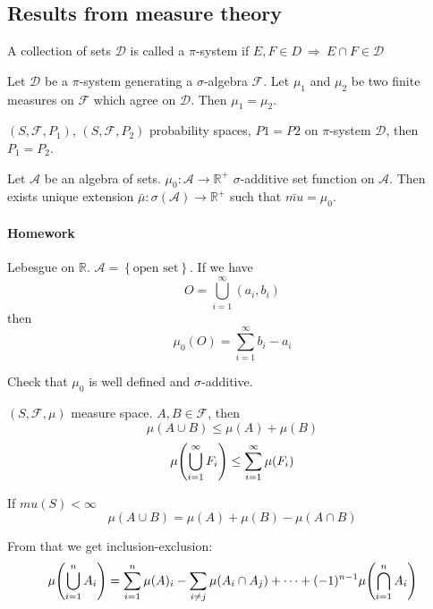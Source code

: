 \subsection{Results from measure theory}
\begin{definition}
	A collection of sets $\mathcal{D}$ is called a $\pi$-system if $E,F \in D \: \Rightarrow \: E\cap F \in \mathcal{D}$
\end{definition}
\begin{theorem}[Uniqness]
	Let $\mathcal{D}$ be a $\pi$-system generating a $\sigma$-algebra $\mathcal{F}$. Let $\mu_1$ and $\mu_2$ be two finite measures on $\mathcal{F}$ which agree on $\mathcal{D}$. Then $\mu_1=\mu_2$.
	
	\begin{coll}
		$(S,\mathcal{F}, P_1)$, $(S,\mathcal{F}, P_2)$ probability spaces, $P1=P2$ on $\pi$-system $\mathcal{D}$, then $P_1=P_2$.
	\end{coll}
\end{theorem}

\begin{theorem}
	Let $\mathcal{A}$ be an algebra of sets. $\mu_0: \mathcal{A} \to \mathbb{R}^+$ $\sigma$-additive set function on $\mathcal{A}$. Then exists unique extension $\bar{\mu} : \sigma(\mathcal{A}) \to \mathbb{R}^+ $ such that $\bar{mu} = \mu_0$.
\end{theorem}

\paragraph{Homework}
Lebesgue on $\mathbb{R}$.  $\mathcal{A} = \left\{ \text{open set} \right\}$. If we have
$$O = \bigcup_{i=1}^\infty (a_i, b_i)$$
then
$$\mu_0(O) = \sum_{i=1}^\infty b_i-a_i$$

Check that $\mu_0$ is well defined and $\sigma$-additive.

\begin{lemma}
	
	$(S,\mathcal{F}, \mu)$ measure space. $A,B \in \mathcal{F}$, then
	$$\mu(A\cup B) \leq \mu(A) + \mu(B) $$
	$$\mu\qty(\bigcup_{i=1}^\infty F_i) \leq \sum_{i=1}^\infty \mu(F_i) $$
	
	If $mu(S) < \infty$
	$$\mu(A\cup B) = \mu(A) + \mu(B) - \mu(A\cap B)$$
	
	From that we get inclusion-exclusion:
	$$\mu\qty(\bigcup_{i=1}^n A_i) = \sum_{i=1}^n \mu(A)_i - \sum_{i\neq j}\mu(A_i\cap A_j) + \dots + (-1)^{n-1} \mu\qty(\bigcap_{i=1}^n A_i)$$
\end{lemma}
